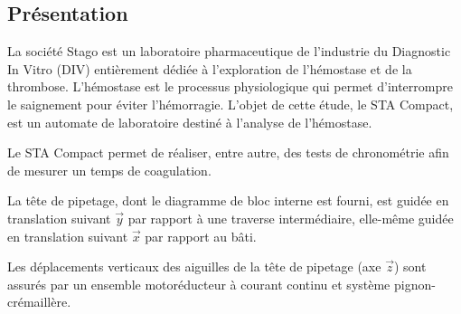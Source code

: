 \documentclass[10pt,fleqn]{article} %
\begin{document}

\vspace{5cm}
\pagestyle{fancy}
\thispagestyle{plain}

\def\columnseprulecolor{\color{ocre}}
\setlength{\columnseprule}{0.4pt} 

\def\pathfig{images}

\begin{multicols}{2}



\subsection*{Présentation}

La société Stago est un laboratoire pharmaceutique de l'industrie du Diagnostic In Vitro (DIV) entièrement dédiée à l'exploration de l'hémostase et de la thrombose. L'hémostase est le processus physiologique qui permet d'interrompre le saignement pour éviter l'hémorragie. L'objet de cette étude, le STA Compact, est un automate de laboratoire destiné à l'analyse de l'hémostase.

Le STA Compact permet de réaliser, entre autre, des tests de chronométrie afin de mesurer un
temps de coagulation. 


La tête de pipetage, dont le diagramme de bloc interne est fourni, est guidée en
translation suivant $\overrightarrow{y}$ par rapport à une traverse intermédiaire, elle-même guidée en translation
suivant $\overrightarrow{x}$ par rapport au bâti. 

Les déplacements verticaux des aiguilles de la tête de pipetage (axe $\overrightarrow{z}$) sont assurés par un ensemble
motoréducteur à courant continu et système pignon-crémaillère.





\end{multicols}
\end{document}
